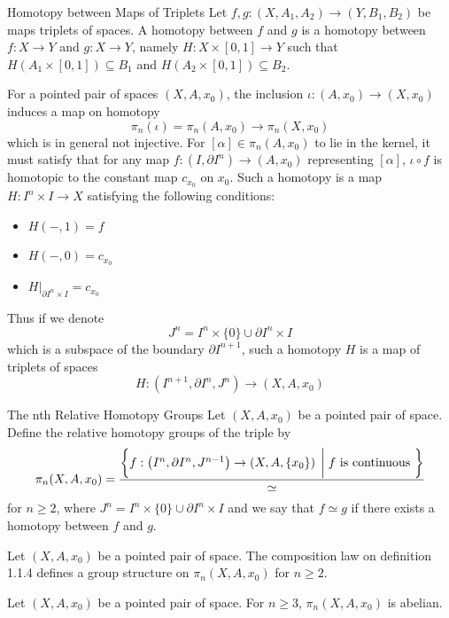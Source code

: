 \documentclass[a4paper]{article}
\begin{document}
\begin{defn}{Homotopy between Maps of Triplets}{} Let $f,g:(X,A_1,A_2)\to(Y,B_1,B_2)$ be maps triplets of spaces. A homotopy between $f$ and $g$ is a homotopy between $f:X\to Y$ and $g:X\to Y$, namely $H:X\times[0,1]\to Y$ such that $H(A_1\times[0,1])\subseteq B_1$ and $H(A_2\times[0,1])\subseteq B_2$. 
\end{defn}

For a pointed pair of spaces $(X,A,x_0)$, the inclusion $\iota:(A,x_0)\to(X,x_0)$ induces a map on homotopy $$\pi_n(\iota)=\pi_n(A,x_0)\to\pi_n(X,x_0)$$ which is in general not injective. For $[\alpha]\in\pi_n(A,x_0)$ to lie in the kernel, it must satisfy that for any map $f:(I,\partial I^n)\to(A,x_0)$ representing $[\alpha]$, $\iota\circ f$ is homotopic to the constant map $c_{x_0}$ on $x_0$. Such a homotopy is a map $H:I^n\times I\to X$ satisfying the following conditions: 
\begin{itemize}
\item $H(-,1)=f$
\item $H(-,0)=c_{x_0}$
\item $H|_{\partial I^n\times I}=c_{x_0}$
\end{itemize}
Thus if we denote $$J^n=I^n\times\{0\}\cup\partial I^n\times I$$ which is a subspace of the boundary $\partial I^{n+1}$, such a homotopy $H$ is a map of triplets of spaces $$H:(I^{n+1},\partial I^n,J^n)\to(X,A,x_0)$$

\begin{defn}{The nth Relative Homotopy Groups}{} Let $(X,A,x_0)$ be a pointed pair of space. Define the relative homotopy groups of the triple by $$\pi_n(X,A,x_0)=\frac{\left\{f:\left(I^n,\partial I^n,J^{n-1}\right)\to\left(X,A,\{x_0\}\right)\;\bigg{|}\;f \text{ is continuous }\right\}}{\simeq}$$ for $n\geq 2$, where $J^n=I^n\times\{0\}\cup\partial I^n\times I$ and we say that $f\simeq g$ if there exists a homotopy between $f$ and $g$. 
\end{defn}

\begin{thm}{}{} Let $(X,A,x_0)$ be a pointed pair of space. The composition law on definition 1.1.4 defines a group structure on $\pi_n(X,A,x_0)$ for $n\geq 2$. 
\end{thm}

\begin{crl}{}{} Let $(X,A,x_0)$ be a pointed pair of space. For $n\geq 3$, $\pi_n(X,A,x_0)$ is abelian. 
\end{crl}
\end{document}
